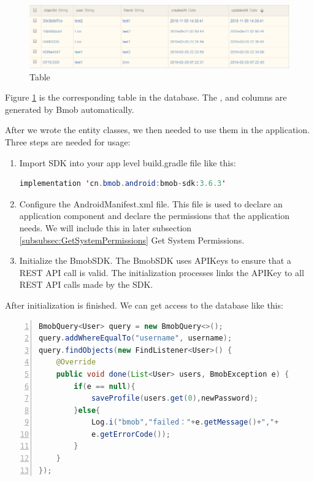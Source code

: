 \begin{figure}[htb]
\centering
\includegraphics[width=1\textwidth]{section04/assets/databaseOverview.png}
\caption[Table Friend]{\label{DatabseOverview}Table }
\end{figure}
\par Figure \ref{DatabseOverview} is the corresponding table in the database. The , and  columns are generated by Bmob automatically. 
\par After we wrote the entity classes, we then needed to use them in the application. Three steps are needed for usage: 
\begin{enumerate}
\item[1)]Import SDK into your app level build.gradle file like this:
\begin{lstlisting}[caption={Import Bmob},language={java},
        basicstyle=\footnotesize\ttfamily,xleftmargin=.1\textwidth, xrightmargin=.2\textwidth]
implementation 'cn.bmob.android:bmob-sdk:3.6.3'
\end{lstlisting} 
\item[2)] Configure the {\ttfamily AndroidManifest.xml} file. This file is used to declare an application component and declare the permissions that the application needs. We will include this in later subsection \ref{subsubsec:GetSystemPermissions} Get System Permissions.
\item[3)] Initialize the BmobSDK. The BmobSDK uses APIKeys to ensure that a REST API call is valid.  The initialization processes links the APIKey to all REST API calls made by the SDK. 

\end{enumerate}
\par After initialization is finished. We can get access to the database like this:
\begin{lstlisting}[caption={Bmob Query Example},            language={java}, numbers=left, basicstyle=\footnotesize\ttfamily,breaklines=true,xleftmargin=.15\textwidth, xrightmargin=.2\textwidth]
BmobQuery<User> query = new BmobQuery<>();
query.addWhereEqualTo("username", username);
query.findObjects(new FindListener<User>() {
    @Override
    public void done(List<User> users, BmobException e) {
        if(e == null){
            saveProfile(users.get(0),newPassword);
        }else{
            Log.i("bmob","failed："+e.getMessage()+","+
            e.getErrorCode());
        }
    }
});
\end{lstlisting} 
